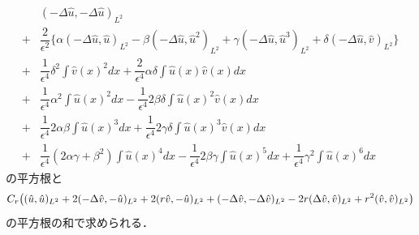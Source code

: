 \begin{align}
  &(-\Delta \hat{u},-\Delta \hat{u})_{L^2}\\%
  +&\dfrac{2}{\epsilon^2}\{\alpha(-\Delta \hat{u},\hat{u})_{L^2}%
  -\beta(-\Delta \hat{u}, \hat{u}^2)_{L^2}
  +\gamma(-\Delta \hat{u}, \hat{u}^3)_{L^2}
  +\delta(-\Delta \hat{u}, \hat{v})_{L^2}\}\\
  +&\dfrac{1}{\epsilon^4}\delta^2 \int \hat{v}(x)^2 dx+\dfrac{2}{\epsilon^4}\alpha\delta \int \hat{u}(x)\hat{v}(x) dx\\
  +&\dfrac{1}{\epsilon^4}\alpha^2 \int \hat{u}(x)^2 dx
  -\dfrac{1}{\epsilon^4}2\beta\delta \int \hat{u}(x)^2\hat{v}(x) dx\\
  +&\dfrac{1}{\epsilon^4}2\alpha\beta\int \hat{u}(x)^3 dx
  +\dfrac{1}{\epsilon^4}2\gamma\delta \int \hat{u}(x)^3\hat{v}(x) dx\\
  +&\dfrac{1}{\epsilon^4}(2\alpha\gamma+\beta^2) \int \hat{u}(x)^4 dx 
  -\dfrac{1}{\epsilon^4}2\beta\gamma \int \hat{u}(x)^5 dx 
  +\dfrac{1}{\epsilon^4}\gamma^2 \int \hat{u}(x)^6 dx
\end{align}
の平方根と
\begin{align}
  C_r
  \qty((\hat{u},\hat{u})_{L^2}
  +2(-\Delta \hat{v},-\hat{u})_{L^2}+2(r \hat{v},-\hat{u})_{L^2}
  +(-\Delta \hat{v},-\Delta \hat{v})_{L^2}
  -2r(\Delta \hat{v}, \hat{v})_{L^2}
  +r^2( \hat{v}, \hat{v})_{L^2})
\end{align}
の平方根の和で求められる．


